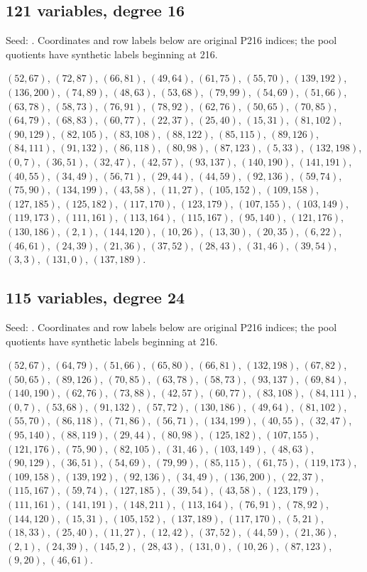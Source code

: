 \documentclass[11pt]{article}
\theoremstyle{definition}\newtheorem{definition}[theorem]{Definition}
\newcommand{\code}[1]{\texttt{\detokenize{#1}}}
\begin{document}
\subsection*{121 variables, degree 16}
Seed: \code{source211.json}. Coordinates and row labels below are original P216 indices; the pool quotients have synthetic labels beginning at 216.
{\small\raggedright
$(52,67)$, $(72,87)$, $(66,81)$, $(49,64)$, $(61,75)$, $(55,70)$, $(139,192)$, $(136,200)$, $(74,89)$, $(48,63)$, $(53,68)$, $(79,99)$, $(54,69)$, $(51,66)$, $(63,78)$, $(58,73)$, $(76,91)$, $(78,92)$, $(62,76)$, $(50,65)$, $(70,85)$, $(64,79)$, $(68,83)$, $(60,77)$, $(22,37)$, $(25,40)$, $(15,31)$, $(81,102)$, $(90,129)$, $(82,105)$, $(83,108)$, $(88,122)$, $(85,115)$, $(89,126)$, $(84,111)$, $(91,132)$, $(86,118)$, $(80,98)$, $(87,123)$, $(5,33)$, $(132,198)$, $(0,7)$, $(36,51)$, $(32,47)$, $(42,57)$, $(93,137)$, $(140,190)$, $(141,191)$, $(40,55)$, $(34,49)$, $(56,71)$, $(29,44)$, $(44,59)$, $(92,136)$, $(59,74)$, $(75,90)$, $(134,199)$, $(43,58)$, $(11,27)$, $(105,152)$, $(109,158)$, $(127,185)$, $(125,182)$, $(117,170)$, $(123,179)$, $(107,155)$, $(103,149)$, $(119,173)$, $(111,161)$, $(113,164)$, $(115,167)$, $(95,140)$, $(121,176)$, $(130,186)$, $(2,1)$, $(144,120)$, $(10,26)$, $(13,30)$, $(20,35)$, $(6,22)$, $(46,61)$, $(24,39)$, $(21,36)$, $(37,52)$, $(28,43)$, $(31,46)$, $(39,54)$, $(3,3)$, $(131,0)$, $(137,189)$.\par}

\subsection*{115 variables, degree 24}
Seed: \code{source209.json}. Coordinates and row labels below are original P216 indices; the pool quotients have synthetic labels beginning at 216.
{\small\raggedright
$(52,67)$, $(64,79)$, $(51,66)$, $(65,80)$, $(66,81)$, $(132,198)$, $(67,82)$, $(50,65)$, $(89,126)$, $(70,85)$, $(63,78)$, $(58,73)$, $(93,137)$, $(69,84)$, $(140,190)$, $(62,76)$, $(73,88)$, $(42,57)$, $(60,77)$, $(83,108)$, $(84,111)$, $(0,7)$, $(53,68)$, $(91,132)$, $(57,72)$, $(130,186)$, $(49,64)$, $(81,102)$, $(55,70)$, $(86,118)$, $(71,86)$, $(56,71)$, $(134,199)$, $(40,55)$, $(32,47)$, $(95,140)$, $(88,119)$, $(29,44)$, $(80,98)$, $(125,182)$, $(107,155)$, $(121,176)$, $(75,90)$, $(82,105)$, $(31,46)$, $(103,149)$, $(48,63)$, $(90,129)$, $(36,51)$, $(54,69)$, $(79,99)$, $(85,115)$, $(61,75)$, $(119,173)$, $(109,158)$, $(139,192)$, $(92,136)$, $(34,49)$, $(136,200)$, $(22,37)$, $(115,167)$, $(59,74)$, $(127,185)$, $(39,54)$, $(43,58)$, $(123,179)$, $(111,161)$, $(141,191)$, $(148,211)$, $(113,164)$, $(76,91)$, $(78,92)$, $(144,120)$, $(15,31)$, $(105,152)$, $(137,189)$, $(117,170)$, $(5,21)$, $(18,33)$, $(25,40)$, $(11,27)$, $(12,42)$, $(37,52)$, $(44,59)$, $(21,36)$, $(2,1)$, $(24,39)$, $(145,2)$, $(28,43)$, $(131,0)$, $(10,26)$, $(87,123)$, $(9,20)$, $(46,61)$.\par}
\end{document}
